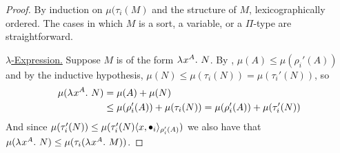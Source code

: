 \documentclass{article}
\begin{document}
\begin{proof}
By induction on $\mu(\tau_i(M)$ and the structure of $M$, lexicographically ordered.
The cases in which $M$ is a sort, a variable, or a $\Pi$-type are straightforward.

\noindent\underline{$\lambda$-Expression.}
Suppose $M$ is of the form $\lambdaT x A N$.
By , $\mu(A) \leq \mu(\rho_i'(A))$ and by the inductive hypothesis, $\mu(N) \leq \mu(\tau_i(N)) = \mu(\tau_i'(N))$, so
\begin{align*}
\mu(\lambdaT x A N) &=
\mu(A) + \mu(N) \\ &\leq
\mu(\rho_i'(A)) + \mu(\tau_i(N)) = \mu(\rho_i'(A)) + \mu(\tau_i'(N))
\end{align*}
And since $\mu(\tau_i'(N)) \leq \mu(\tau_i'(N)\pair[\rho_i'(A)] x {\bullet_i})$ we also have that $\mu(\lambdaT x A N) \leq \mu(\tau_i(\lambdaT x A M))$.


\end{proof}
\end{document}
